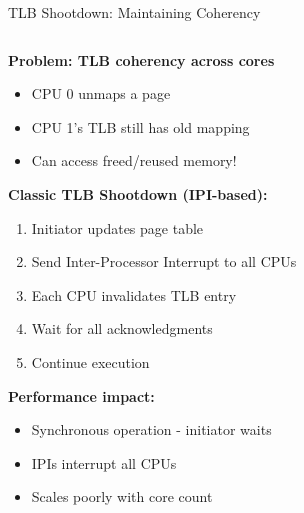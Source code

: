 \documentclass[aspectratio=169,12pt]{beamer}
\begin{document}
\begin{frame}{TLB Shootdown: Maintaining Coherency}
\begin{columns}[T]
\begin{column}{0.55\textwidth}
\textbf{Problem: TLB coherency across cores}
\begin{itemize}
\item CPU 0 unmaps a page
\item CPU 1's TLB still has old mapping
\item Can access freed/reused memory!
\end{itemize}

\textbf{Classic TLB Shootdown (IPI-based):}
\begin{enumerate}
\item Initiator updates page table
\item Send Inter-Processor Interrupt to all CPUs
\item Each CPU invalidates TLB entry
\item Wait for all acknowledgments
\item Continue execution
\end{enumerate}

\textbf{Performance impact:}
\begin{itemize}
\item Synchronous operation - initiator waits
\item IPIs interrupt all CPUs
\item Scales poorly with core count
\end{itemize}
\end{column}

\begin{column}{0.45\textwidth}
\begin{center}
\end{center}
\end{column}
\end{columns}
\end{frame}
\end{document}
